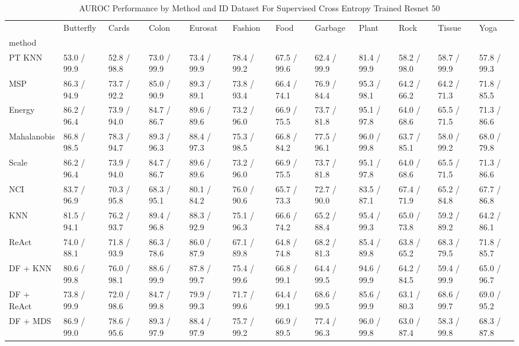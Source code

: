 \documentclass[letterpaper]{article} %
\theoremstyle{plain}
\theoremstyle{definition}
\theoremstyle{remark}
\begin{document}
\begin{table}
\caption{AUROC Performance by Method and ID Dataset For Supervised Cross Entropy Trained Resnet 50}


\label{tab:auroc_results_resnet}
\begin{tabular}{llllllllllll}
\toprule
 & Butterfly & Cards & Colon & Eurosat & Fashion & Food & Garbage & Plant & Rock & Tissue & Yoga \\
method &  &  &  &  &  &  &  &  &  &  &  \\
\midrule
PT KNN & 53.0 / 99.9 & 52.8 / 98.8 & 73.0 / 99.9 & 73.4 / 99.9 & 78.4 / 99.2 & 67.5 / 99.6 & 62.4 / 99.9 & 81.4 / 99.9 & 58.2 / 98.0 & 58.7 / 99.9 & 57.8 / 99.3 \\
MSP & 86.3 / 94.9 & 73.7 / 92.2 & 85.0 / 90.9 & 89.3 / 89.1 & 73.8 / 93.4 & 66.4 / 74.1 & 76.9 / 84.4 & 95.3 / 98.1 & 64.2 / 66.2 & 64.2 / 71.3 & 71.8 / 85.5 \\
Energy & 86.2 / 96.4 & 73.9 / 94.0 & 84.7 / 86.7 & 89.6 / 89.6 & 73.2 / 96.0 & 66.9 / 75.5 & 73.7 / 81.8 & 95.1 / 97.8 & 64.0 / 68.6 & 65.5 / 71.5 & 71.3 / 86.6 \\
Mahalanobis & 86.8 / 98.5 & 78.3 / 94.7 & 89.3 / 96.3 & 88.4 / 97.3 & 75.3 / 98.5 & 66.8 / 84.2 & 77.5 / 96.1 & 96.0 / 99.8 & 63.7 / 85.1 & 58.0 / 99.2 & 68.0 / 79.8 \\
Scale & 86.2 / 96.4 & 73.9 / 94.0 & 84.7 / 86.7 & 89.6 / 89.6 & 73.2 / 96.0 & 66.9 / 75.5 & 73.7 / 81.8 & 95.1 / 97.8 & 64.0 / 68.6 & 65.5 / 71.5 & 71.3 / 86.6 \\
NCI & 83.7 / 96.9 & 70.3 / 95.8 & 68.3 / 95.1 & 80.1 / 84.2 & 76.0 / 90.6 & 65.7 / 73.3 & 72.7 / 90.0 & 83.5 / 87.1 & 67.4 / 71.9 & 65.2 / 84.8 & 67.7 / 86.8 \\
KNN & 81.5 / 94.1 & 76.2 / 93.7 & 89.4 / 96.8 & 88.3 / 92.9 & 75.1 / 96.3 & 66.6 / 74.2 & 65.2 / 88.4 & 95.4 / 99.3 & 65.0 / 73.8 & 59.2 / 89.2 & 64.2 / 86.1 \\
ReAct & 74.0 / 88.1 & 71.8 / 93.9 & 86.3 / 78.6 & 86.0 / 87.9 & 67.1 / 89.8 & 64.8 / 74.8 & 68.2 / 81.3 & 85.4 / 89.8 & 63.8 / 65.2 & 68.3 / 79.5 & 71.8 / 85.7 \\
DF + KNN & 80.6 / 99.8 & 76.0 / 98.1 & 88.6 / 99.9 & 87.8 / 99.7 & 75.4 / 99.6 & 66.8 / 99.1 & 64.4 / 99.5 & 94.6 / 99.9 & 64.2 / 84.5 & 59.4 / 99.9 & 65.0 / 96.7 \\
DF + ReAct & 73.8 / 99.9 & 72.0 / 98.6 & 84.7 / 99.8 & 79.9 / 99.3 & 71.7 / 99.6 & 64.4 / 99.1 & 68.6 / 99.5 & 85.6 / 99.9 & 63.1 / 80.3 & 68.6 / 99.7 & 69.0 / 95.2 \\
DF + MDS & 86.9 / 99.0 & 78.6 / 95.6 & 89.3 / 97.9 & 88.4 / 97.9 & 75.7 / 99.2 & 66.9 / 89.5 & 77.4 / 96.3 & 96.0 / 99.8 & 63.0 / 87.4 & 58.3 / 99.8 & 68.3 / 87.8 \\
\bottomrule
\end{tabular}

\end{table}
\end{document}

